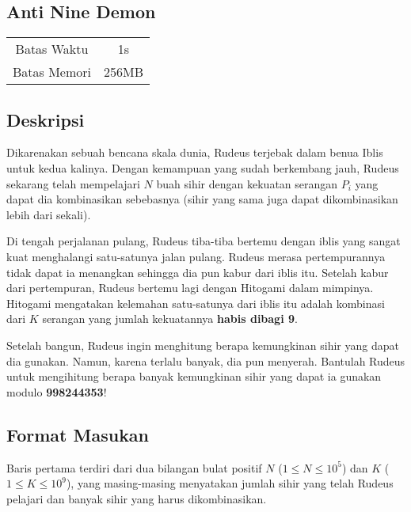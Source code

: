 \documentclass{article}
\begin{document}
\begin{center}

    
    \section*{Anti Nine Demon} %

    \begin{tabular}{ | c c | }
        \hline
        Batas Waktu  & 1s \\    %
        Batas Memori & 256MB \\  %
        \hline
    \end{tabular}
\end{center}

\subsection*{Deskripsi}

Dikarenakan sebuah bencana skala dunia, Rudeus terjebak dalam benua Iblis untuk kedua kalinya. Dengan kemampuan yang sudah berkembang jauh, Rudeus sekarang telah mempelajari $N$ buah sihir dengan kekuatan serangan $P_{i}$ yang dapat dia kombinasikan sebebasnya (sihir yang sama juga dapat dikombinasikan lebih dari sekali). 

Di tengah perjalanan pulang, Rudeus tiba-tiba bertemu dengan iblis yang sangat kuat menghalangi satu-satunya jalan pulang. Rudeus merasa pertempurannya tidak dapat ia menangkan sehingga dia pun kabur dari iblis itu. Setelah kabur dari pertempuran, Rudeus bertemu lagi dengan Hitogami dalam mimpinya. Hitogami mengatakan kelemahan satu-satunya dari iblis itu adalah kombinasi dari $K$ serangan yang jumlah kekuatannya \textbf{habis dibagi 9}.

Setelah bangun, Rudeus ingin menghitung berapa kemungkinan sihir yang dapat dia gunakan. Namun, karena terlalu banyak, dia pun menyerah. Bantulah Rudeus untuk mengihitung berapa banyak kemungkinan sihir yang dapat ia gunakan modulo \textbf{998244353}!

\subsection*{Format Masukan}

Baris pertama terdiri dari dua bilangan bulat positif $N$ ($1 \leq N \leq 10^{5}$) dan $K$ ($1 \leq K \leq 10^{9}$), yang masing-masing menyatakan jumlah sihir yang telah Rudeus pelajari dan banyak sihir yang harus dikombinasikan.
\end{document}
